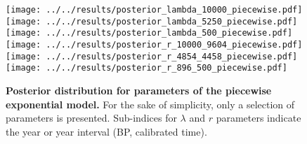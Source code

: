 \documentclass[a4paper]{article}
\begin{document}





\begin{figure}[h]
\begin{center}
\texttt{[image: ../../results/posterior\_lambda\_10000\_piecewise.pdf]}\texttt{[image: ../../results/posterior\_lambda\_5250\_piecewise.pdf]}\texttt{[image: ../../results/posterior\_lambda\_500\_piecewise.pdf]}
\texttt{[image: ../../results/posterior\_r\_10000\_9604\_piecewise.pdf]}\texttt{[image: ../../results/posterior\_r\_4854\_4458\_piecewise.pdf]}\texttt{[image: ../../results/posterior\_r\_896\_500\_piecewise.pdf]}
\end{center}
\caption{\textbf{Posterior distribution for parameters of the piecewise exponential model.} For the sake of simplicity, only a selection of parameters is presented. Sub-indices for $\lambda$ and $r$ parameters indicate the year or year interval (BP, calibrated time).}
\label{fig:posterior_dynamic}
\end{figure}
\end{document}
